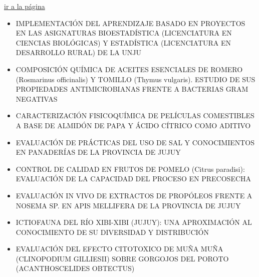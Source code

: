 \documentclass[
  spanish,
  letterpaper,
  DIV=11,
  numbers=noendperiod]{scrreprt}
\begin{document}
\begin{tcolorbox}[enhanced jigsaw, arc=.35mm, colframe=quarto-callout-note-color-frame, opacityback=0, leftrule=.75mm, titlerule=0mm, colbacktitle=quarto-callout-note-color!10!white, breakable, bottomrule=.15mm, colback=white, bottomtitle=1mm, toptitle=1mm, coltitle=black, title={Jueves 18}, left=2mm, opacitybacktitle=0.6, toprule=.15mm, rightrule=.15mm]

\href{jueves_18.qmd}{ir a la página}

\begin{itemize}
\item
  IMPLEMENTACIÓN DEL APRENDIZAJE BASADO EN PROYECTOS EN LAS ASIGNATURAS
  BIOESTADÍSTICA (LICENCIATURA EN CIENCIAS BIOLÓGICAS) Y ESTADÍSTICA
  (LICENCIATURA EN DESARROLLO RURAL) DE LA UNJU
\item
  COMPOSICIÓN QUÍMICA DE ACEITES ESENCIALES DE ROMERO (Rosmarinus
  officinalis) Y TOMILLO (Thymus vulgaris). ESTUDIO DE SUS PROPIEDADES
  ANTIMICROBIANAS FRENTE A BACTERIAS GRAM NEGATIVAS
\item
  CARACTERIZACIÓN FISICOQUÍMICA DE PELÍCULAS COMESTIBLES A BASE DE
  ALMIDÓN DE PAPA Y ÁCIDO CÍTRICO COMO ADITIVO
\item
  EVALUACIÓN DE PRÁCTICAS DEL USO DE SAL Y CONOCIMIENTOS EN PANADERÍAS
  DE LA PROVINCIA DE JUJUY
\item
  CONTROL DE CALIDAD EN FRUTOS DE POMELO (Citrus paradisi): EVALUACIÓN
  DE LA CAPACIDAD DEL PROCESO EN PRECOSECHA
\item
  EVALUACIÓN IN VIVO DE EXTRACTOS DE PROPÓLEOS FRENTE A NOSEMA SP. EN
  APIS MELLIFERA DE LA PROVINCIA DE JUJUY
\item
  ICTIOFAUNA DEL RÍO XIBI-XIBI (JUJUY): UNA APROXIMACIÓN AL CONOCIMIENTO
  DE SU DIVERSIDAD Y DISTRIBUCIÓN
\item
  EVALUACIÓN DEL EFECTO CITOTOXICO DE MUÑA MUÑA (CLINOPODIUM GILLIESII)
  SOBRE GORGOJOS DEL POROTO (ACANTHOSCELIDES OBTECTUS)
\end{itemize}

\end{tcolorbox}
\end{document}
